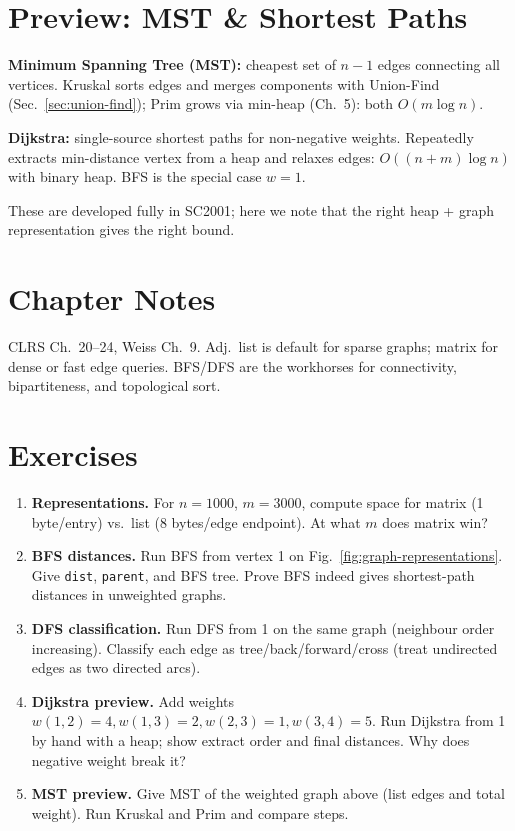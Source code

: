 \section{Preview: MST \& Shortest Paths}
\label{sec:mst-dijkstra-preview}
\textbf{Minimum Spanning Tree (MST):} cheapest set of $n-1$ edges connecting all vertices. Kruskal sorts edges and merges components with Union-Find (Sec.~\ref{sec:union-find}); Prim grows via min-heap (Ch.~5): both $O(m\log n)$.

\textbf{Dijkstra:} single-source shortest paths for non-negative weights. Repeatedly extracts min-distance vertex from a heap and relaxes edges: $O((n+m)\log n)$ with binary heap. BFS is the special case $w=1$.

These are developed fully in SC2001; here we note that the right heap + graph representation gives the right bound.

\section{Chapter Notes}
CLRS Ch.~20--24, Weiss Ch.~9. Adj.\ list is default for sparse graphs; matrix for dense or fast edge queries. BFS/DFS are the workhorses for connectivity, bipartiteness, and topological sort.

\section{Exercises}
\label{sec:ch07-exercises}
\begin{enumerate}[label=E7.\arabic*, leftmargin=*, itemsep=0.7em]
    \item \textbf{Representations.} For $n=1000$, $m=3000$, compute space for matrix (1 byte/entry) vs.\ list (8 bytes/edge endpoint). At what $m$ does matrix win?
    \item \textbf{BFS distances.} Run BFS from vertex 1 on Fig.~\ref{fig:graph-representations}. Give \texttt{dist}, \texttt{parent}, and BFS tree. Prove BFS indeed gives shortest-path distances in unweighted graphs.
    \item \textbf{DFS classification.} Run DFS from 1 on the same graph (neighbour order increasing). Classify each edge as tree/back/forward/cross (treat undirected edges as two directed arcs).
    \item \textbf{Dijkstra preview.} Add weights $w(1,2)=4,w(1,3)=2,w(2,3)=1,w(3,4)=5$. Run Dijkstra from 1 by hand with a heap; show extract order and final distances. Why does negative weight break it?
    \item \textbf{MST preview.} Give MST of the weighted graph above (list edges and total weight). Run Kruskal and Prim and compare steps.
\end{enumerate}
